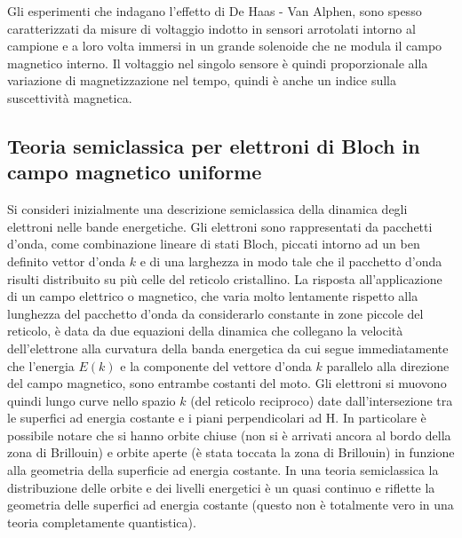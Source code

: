 Gli esperimenti che indagano l'effetto di De Haas - Van Alphen, sono spesso caratterizzati da misure di voltaggio indotto in sensori arrotolati intorno al campione e a loro volta immersi in un grande solenoide che ne modula il campo magnetico interno. Il voltaggio nel singolo sensore \`e quindi proporzionale alla variazione di magnetizzazione nel tempo, quindi \`e anche un indice sulla suscettivit\`a magnetica. 
\subsection{Teoria semiclassica per elettroni di Bloch in campo magnetico uniforme}
Si consideri inizialmente una descrizione semiclassica della dinamica degli elettroni nelle bande energetiche. Gli elettroni sono rappresentati da pacchetti d'onda, come combinazione lineare di stati Bloch, piccati intorno ad un ben definito vettor d'onda $k$ e di una larghezza in modo tale che il pacchetto d'onda risulti distribuito su pi\`u celle del reticolo cristallino. La risposta all'applicazione di un campo elettrico o magnetico, che varia molto lentamente rispetto alla lunghezza del pacchetto d'onda da considerarlo constante in zone piccole del reticolo, \`e data da due equazioni della dinamica che collegano la velocit\`a dell'elettrone alla curvatura della banda energetica
da cui segue immediatamente che l'energia $E(k)$ e la componente  del vettore d'onda $k$ parallelo alla direzione del campo magnetico, sono entrambe costanti del moto. Gli elettroni si muovono quindi lungo curve nello spazio $k$ (del reticolo reciproco) date dall'intersezione tra le superfici ad energia costante e i piani perpendicolari ad H. In particolare \`e possibile notare che si hanno orbite chiuse (non si \`e arrivati ancora al bordo della zona di Brillouin) e orbite aperte (\`e stata toccata la zona di Brillouin) in funzione alla geometria della superficie ad energia costante. In una teoria semiclassica la distribuzione delle orbite e dei livelli energetici \`e un quasi continuo e riflette la geometria delle superfici ad energia costante (questo non \`e totalmente vero in una teoria completamente quantistica).


